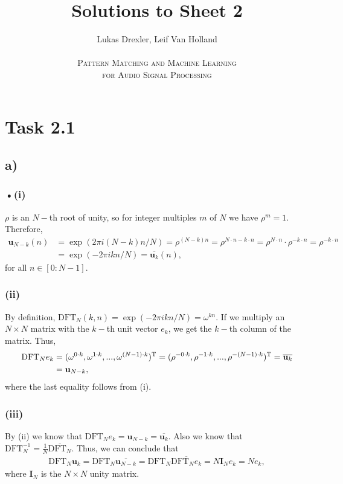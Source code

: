 \documentclass[12pt]{article}
\begin{document}
\title{Solutions to Sheet 2}
\author{Lukas Drexler, Leif Van Holland \\ \\
\textsc{Pattern Matching and Machine Learning} \\
\textsc{for Audio Signal Processing}}
\maketitle

\section*{Task 2.1}
\subsection*{a)}
\subsubsection*{•(i)}
$\rho$ is an $N-$th root of unity, so for integer multiples $m$ of $N$ we have $\rho^{m} = 1$. Therefore,
\begin{align*}
\mathbf{u}_{N-k}(n) &= \exp(2\pi i(N-k)n/N) = \rho^{(N-k)n} = \rho^{N\cdot n-k\cdot n} = \rho^{N\cdot n}\cdot \rho^{-k\cdot n} = \rho^{-k\cdot n}\\
&=\exp(-2\pi ikn/N) = \overline{\mathbf{u}_{k}}(n),
\end{align*}
for all $n \in [0:N-1]$.
\subsubsection*{(ii)}
By definition, $\text{DFT}_{N}(k,n) = \exp(-2\pi ikn/N) = \omega^{kn}$. If we multiply an $N\times N$ matrix with the $k-$th unit vector $e_{k}$, we get the $k-$th column of the matrix.
Thus,
\begin{align*}
\text{DFT}_{N}e_{k} &= (\omega^{0\cdot k},\omega^{1\cdot k}, ... , \omega^{(N-1)\cdot k})^{\textsc{T}} = (\rho^{-0\cdot k},\rho^{-1\cdot k}, ... , \rho^{-(N-1)\cdot k})^{\textsc{T}} = \overline{\mathbf{u}_{k}} \\&= \mathbf{u}_{N-k},
\end{align*}
where the last equality follows from (i).
\subsubsection*{(iii)}
By (ii) we know that $\text{DFT}_N e_{k} = \mathbf{u}_{N-k} = \overline{\mathbf{u}_{k}}.$ Also we know that $\text{DFT}_N^{-1} = \frac{1}{N} \overline{\text{DFT}_N}.$ Thus, we can conclude that
\begin{align*}
\text{DFT}_N \mathbf{u}_{k} = \text{DFT}_N \overline{\mathbf{u}_{N-k}} = \text{DFT}_N \overline{\text{DFT}_N e_{k}} = N \mathbf{I}_{N} e_{k} = N e_{k},
\end{align*}
where $\mathbf{I}_{N}$ is the $N\times N$ unity matrix.
\end{document}
